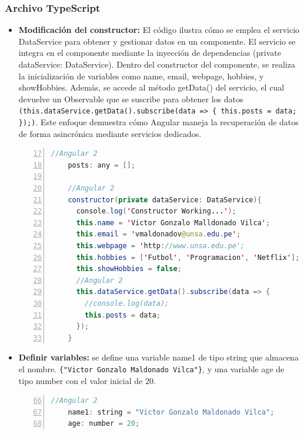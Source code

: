 \documentclass{article}
\begin{document}
  \subsubsection{Archivo TypeScript}
  \begin{itemize}
    \item \textbf{Modificación del constructor: }El código ilustra cómo se emplea el servicio DataService para obtener y gestionar 
    datos en un componente. El servicio se integra en el componente mediante la inyección de dependencias 
    (private dataService: DataService). Dentro del constructor del componente, se realiza la inicialización de 
    variables como name, email, webpage, hobbies, y showHobbies. Además, se accede al método getData() del servicio, 
    el cual devuelve un Observable que se suscribe para obtener los datos 
    \newline
    \verb|(this.dataService.getData().subscribe(data => { this.posts = data; });)|. 
    Este enfoque demuestra cómo Angular maneja la recuperación de datos de forma asincrónica mediante servicios dedicados.
    \begin{lstlisting}[language=java, numbers=left, firstnumber=17, numberstyle=\color{black}]
    //Angular 2
    posts: any = [];
    
    //Angular 2
    constructor(private dataService: DataService){
      console.log('Constructor Working...');
      this.name = 'Victor Gonzalo Malldonado Vilca';
      this.email = 'vmaldonadov@unsa.edu.pe';
      this.webpage = 'http://www.unsa.edu.pe';
      this.hobbies = ['Futbol', 'Programacion', 'Netflix'];
      this.showHobbies = false;
      //Angular 2
      this.dataService.getData().subscribe(data => {
        //console.log(data);
        this.posts = data;
      });
    }
    \end{lstlisting}
    \item \textbf{Definir variables: }se define una variable name1 de tipo string que almacena el nombre.
    \newline
    \verb|{"Victor Gonzalo Maldonado Vilca"}|, y una variable age de tipo number con el valor inicial de 20. 
    \begin{lstlisting}[language=java, numbers=left, firstnumber=66, numberstyle=\color{black}]
    //Angular 2
    name1: string = "Victor Gonzalo Maldonado Vilca";
    age: number = 20;
    \end{lstlisting}
  \end{itemize}
  
\end{document}
